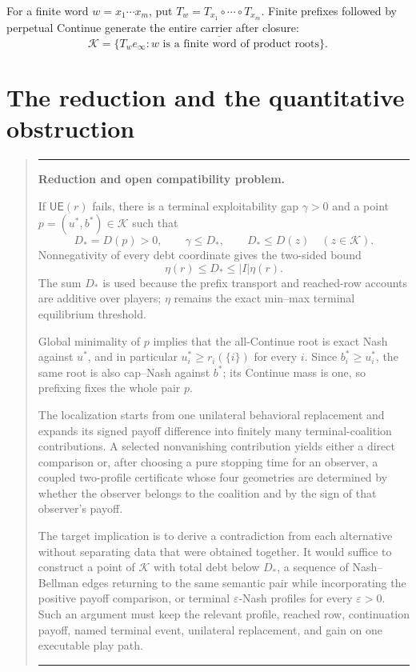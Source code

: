 \documentclass[11pt]{article}
\newcommand{\K}{\mathcal K}
\newcommand{\UE}{\mathsf{UE}}
\newenvironment{guidebox}[1]
{\def\guidecolor{#1}\par\medskip\begingroup\color{\guidecolor}%
 \begin{quote}\hrule\medskip\color{black}}
{\par\medskip\color{\guidecolor}\hrule\end{quote}%
 \endgroup\par\medskip}
\begin{document}
For a finite word $w=x_1\cdots x_m$, put
$T_w=T_{x_1}\circ\cdots\circ T_{x_m}$.  Finite prefixes followed by
perpetual Continue generate the entire carrier after closure:
\begin{equation}
\label{eq:carrier-generation}
 \boxed{\K=\overline{\{T_we_\infty:w\text{ is a finite word of product roots}\}}.}
\end{equation}

\section{The reduction and the quantitative obstruction}
\label{sec:reduction}

\begin{guidebox}{GuideRed}
\textbf{Reduction and open compatibility problem.}

If $\UE(r)$ fails, there is a terminal exploitability gap $\gamma>0$ and a
point $p=(u^*,b^*)\in\K$ such that
\begin{equation}
\label{eq:minimum-package}
 D_*=D(p)>0,
 \qquad \gamma\le D_*,
 \qquad D_*\le D(z)\quad(z\in\K).
\end{equation}
Nonnegativity of every debt coordinate gives the two-sided bound
\[
 \eta(r)\le D_*\le |I|\eta(r).
\]
The sum $D_*$ is used because the prefix transport and reached-row accounts
are additive over players; $\eta$ remains the exact min--max terminal
equilibrium threshold.

Global minimality of $p$ implies that the all-Continue root is exact Nash
against $u^*$, and in particular $u_i^*\ge r_i(\{i\})$ for every $i$.
Since $b_i^*\ge u_i^*$, the same root is also cap--Nash against $b^*$; its
Continue mass is one, so prefixing fixes the whole pair $p$.

The localization starts from one unilateral behavioral replacement and
expands its signed payoff difference into finitely many terminal-coalition
contributions.  A selected nonvanishing contribution yields either a direct
comparison or, after choosing a pure stopping time for an observer, a coupled
two-profile certificate whose four geometries are determined by whether the
observer belongs to the coalition and by the sign of that observer's payoff.

The target implication is to derive a contradiction from each
alternative without separating data that were obtained together.  It would
suffice to construct a point of $\K$ with total debt below $D_*$, a sequence
of Nash--Bellman edges returning to the same semantic pair while
incorporating the positive payoff comparison, or terminal
$\varepsilon$-Nash profiles for every $\varepsilon>0$.  Such an argument
must keep the relevant profile, reached row, continuation payoff, named
terminal event, unilateral replacement, and gain on one executable
play path.


\end{guidebox}
\end{document}
